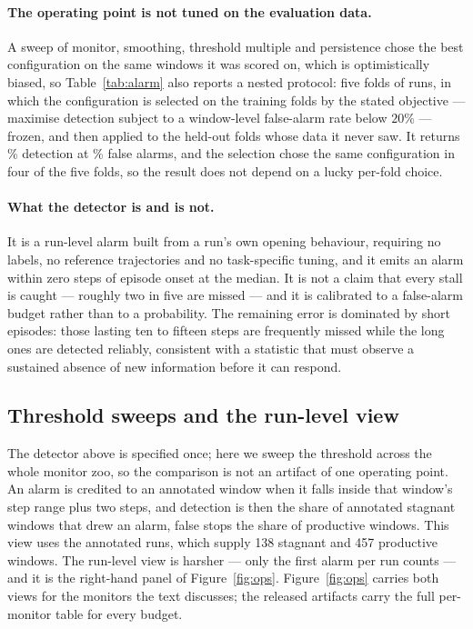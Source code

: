 \paragraph{The operating point is not tuned on the evaluation data.} A sweep of monitor, smoothing,
threshold multiple and persistence chose the best configuration on the same windows it was scored on,
which is optimistically biased, so Table~\ref{tab:alarm} also reports a nested protocol: five folds of
\pnestedRuns{} runs, in which the configuration is selected on the training folds by the stated objective
--- maximise detection subject to a window-level false-alarm rate below $20\%$ --- frozen, and then applied
to the held-out folds whose data it never saw. It returns \pnestedDet{}\% detection at \pnestedFa{}\%
false alarms, and the selection chose the same configuration in four of the five folds, so the result does
not depend on a lucky per-fold choice.

\paragraph{What the detector is and is not.} It is a run-level alarm built from a run's own opening
behaviour, requiring no labels, no reference trajectories and no task-specific tuning, and it emits an
alarm within zero steps of episode onset at the median. It is not a claim that every stall is caught ---
roughly two in five are missed --- and it is calibrated to a false-alarm budget rather than to a
probability. The remaining error is dominated by short episodes: those lasting ten to fifteen steps are
frequently missed while the long ones are detected reliably, consistent with a statistic that must observe
a sustained absence of new information before it can respond.

\subsection{Threshold sweeps and the run-level view}
\label{sec:res-alarm}
The detector above is specified once; here we sweep the threshold across the whole monitor zoo, so the
comparison is not an artifact of one operating point. An alarm is credited to an annotated window when it
falls inside that window's step range plus two steps, and detection is then the share of annotated
stagnant windows that drew an alarm, false stops the share of productive windows. This view uses the
\pnAlarmTraj{} annotated runs, which supply 138 stagnant and 457 productive windows. The run-level view is
harsher --- only the first alarm per run counts --- and it is the right-hand panel of
Figure~\ref{fig:ops}. Figure~\ref{fig:ops} carries both views for the monitors the text discusses; the
released artifacts carry the full per-monitor table for every budget.

